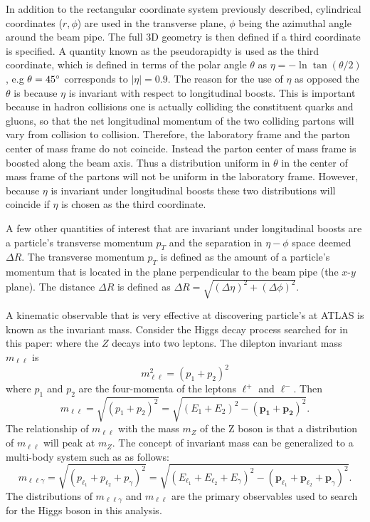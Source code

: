 In addition to the rectangular coordinate system previously described,
cylindrical coordinates ($r, \phi$) are
used in the transverse plane, $\phi$ being the azimuthal angle around the
beam pipe. The full 3D geometry is then defined if a third coordinate is specified.
A quantity known as the pseudorapidty is used as the third coordinate, 
which is defined in terms of the 
polar angle $\theta$ as $\eta = -\ln \tan(\theta/2)$, e.g $\theta = 45^\circ$
corresponds to $|\eta| = 0.9$. The reason for the use of $\eta$ as opposed
the $\theta$ is because $\eta$ is invariant with respect to longitudinal boosts. This
is important because in hadron collisions one is actually colliding the
constituent quarks and gluons, so that the net longitudinal momentum of the two
colliding partons will vary from collision to collision. Therefore, the laboratory
frame and the parton center of mass frame do not coincide. Instead the parton
center of mass frame is boosted along the beam axis. Thus a distribution
uniform in $\theta$ in the center of mass frame of the partons will not
be uniform in the laboratory frame. However, because $\eta$ is invariant
under longitudinal boosts these two distributions will coincide if $\eta$
is chosen as the third coordinate.

A few other quantities of interest that are invariant under longitudinal boosts
are a particle's transverse momentum $p_T$ and the separation in $\eta-\phi$
space deemed $\Delta R$. The transverse momentum $p_T$ is defined as the 
amount of a particle's momentum that is located in the plane perpendicular 
to the beam pipe (the $x$-$y$ plane). The distance $\Delta R$ 
is defined as $\Delta R = \sqrt{(\Delta \eta)^2 + (\Delta \phi)^2}$.

A kinematic observable that is very effective at discovering particle's at
ATLAS is known as the invariant mass. Consider the Higgs decay process
searched for in this paper: \HTollg where the $Z$ decays into two leptons.
The dilepton invariant mass $m_{\ell\ell}$ is
\[
    m^2_{\ell\ell} = (p_1 + p_2)^2
\]
where $p_1$ and $p_2$ are the four-momenta of the leptons $\ell^+$ and $\ell^-$.
Then
\[
    m_{\ell\ell} = \sqrt{(p_1 + p_2)^2} = \sqrt{(E_1 + E_2)^2 - (\mathbf{p_1} + \mathbf{p_2})^2}.
\]
The relationship of $m_{\ell\ell}$ with the mass $m_Z$ of the Z boson is that a
distribution of $m_{\ell\ell}$ will peak at $m_{Z}$. The concept of invariant
mass can be generalized to a multi-body system such as \HTollg as follows:
\[
    m_{\ell\ell\gamma} = \sqrt{(p_{\ell_1} + p_{\ell_2} + p_{\gamma})^2} =
    \sqrt{(E_{\ell_1} + E_{\ell_2} + E_{\gamma})^2 - (\mathbf{p}_{\ell_1} + 
    \mathbf{p}_{\ell_2} + \mathbf{p}_{\gamma})^2}. 
\]
The distributions of $m_{\ell\ell\gamma}$ and $m_{\ell\ell}$ are the primary
observables used to search for the Higgs boson in this analysis.

